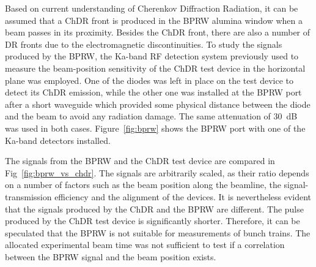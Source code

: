 Based on current understanding of Cherenkov Diffraction Radiation, it can be assumed that a ChDR front is produced in the BPRW alumina window when a beam passes in its proximity. Besides the ChDR front, there are also a number of DR fronts due to the electromagnetic discontinuities. To study the signals produced by the BPRW, the Ka-band RF detection system previously used to measure the beam-position sensitivity of the ChDR test device in the horizontal plane was employed. One of the diodes was left in place on the test device to detect its ChDR emission, while the other one was installed at the BPRW port after a short waveguide which provided some physical distance between the diode and the beam to avoid any radiation damage. The same attenuation of 30~dB was used in both cases. Figure~\ref{fig:bprw} shows the BPRW port with one of the Ka-band detectors installed.

The signals from the BPRW and the ChDR test device are compared in Fig~\ref{fig:bprw_vs_chdr}. The signals are arbitrarily scaled, as their ratio depends on a number of factors such as the beam position along the beamline, the signal-transmission efficiency and the alignment of the devices. It is nevertheless evident that the signals produced by the ChDR and the BPRW are different. The pulse produced by the ChDR test device is significantly shorter. Therefore, it can be speculated that the BPRW is not suitable for measurements of bunch trains. The allocated experimental beam time was not sufficient to test if a correlation between the BPRW signal and the beam position exists. 

